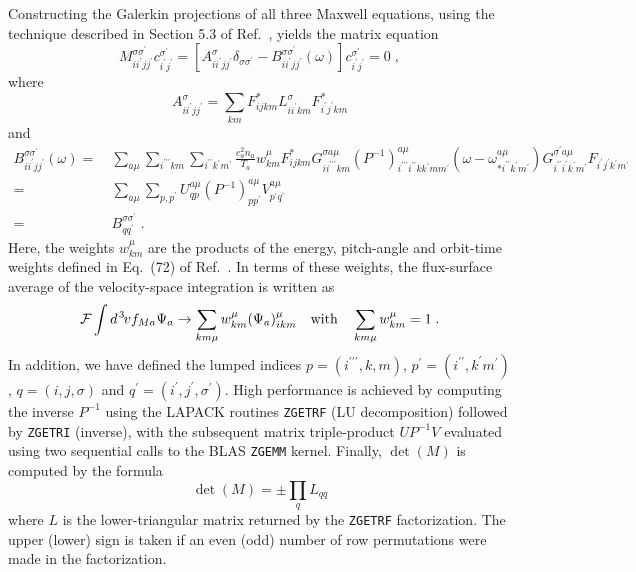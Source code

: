 %
Constructing the Galerkin projections of all three Maxwell 
equations, using the technique described in Section 5.3 
of Ref.~\cite{candy:2003}, yields the matrix equation
%
\begin{equation}
M_{ii^\prime jj^\prime} ^{\sigma\sigma^\prime} c_{i^\prime j^\prime}^{\sigma^\prime}  
= \left[ A_{ii^\prime jj^\prime}^\sigma \delta_{\sigma\sigma^\prime} -
B_{ii^\prime jj^\prime}^{\sigma\sigma^\prime}(\omega) \right] 
c_{i^\prime j^\prime}^{\sigma^\prime} = 0 \; ,
\end{equation}
%
where
%
\begin{equation}
 A_{ii^\prime jj^\prime}^\sigma = \sum_{km} 
 F_{ijkm}^* L^\sigma_{ii^\prime km} F_{i^\prime j^\prime km}^* 
\end{equation}
%
and
%
\begin{align}
B_{ii^\prime jj^\prime}^{\sigma\sigma^\prime}(\omega) =
&~\sum_{a\mu} \sum_{i^{\prime\prime\prime} k m} \sum_{i^{\prime\prime} k^\prime m^\prime}
\frac{e_a^2 n_a}{T_a} w_{km}^\mu F_{ijkm}^* G_{ii^{\prime\prime\prime} km}^{\sigma a\mu}
(P^{-1})_{i^{\prime\prime\prime} i^{\prime\prime} kk^\prime mm^\prime}^{a\mu}
(\omega-\omega_{*i^{\prime\prime} k^\prime m^\prime}^{a\mu})
G_{i^{\prime\prime} i^{\prime} k^\prime m^\prime}^{\sigma^\prime a\mu}
 F_{i^\prime j^\prime k^\prime m^\prime} \\
= &~\sum_{a\mu} \sum_{p,p^\prime} U_{q p}^{a\mu} (P^{-1})_{p p^\prime}^{a\mu} 
V_{p^\prime q^\prime}^{a\mu} \\
= &~B_{qq^\prime}^{\sigma \sigma^\prime} \; .
\end{align}
%
Here, the weights $w_{km}^\mu$ are the products of the energy, 
pitch-angle and orbit-time weights defined in Eq.~(72) of 
Ref.~\cite{candy:2003}.  In terms of these weights, the flux-surface 
average of the velocity-space integration is written as 
%
\begin{equation}
{\cal F} \int d^{\hskip 1pt 3} \hskip -1pt v f_{Ma} \Psi_a \rightarrow  
 \sum_{km\mu} w_{km}^\mu (\Psi_a)_{ikm}^\mu 
\quad\mbox{with}\quad
\sum_{km\mu} w_{km}^\mu = 1 \; .
\end{equation}
%
In addition, we have defined the lumped indices 
$p=(i^{\prime\prime\prime},k,m)$, $p^\prime = (i^{\prime\prime},k^\prime
m^\prime)$, $q=(i,j,\sigma)$ and $q^\prime=(i^\prime,j^\prime,\sigma^\prime)$.  
High performance is achieved by computing the inverse $P^{-1}$ using 
the LAPACK routines {\tt ZGETRF} (LU decomposition) followed by 
{\tt ZGETRI} (inverse), with the subsequent matrix triple-product 
$U P^{-1} V$ evaluated using two sequential calls to the 
BLAS {\tt ZGEMM} kernel.  Finally, $\det (M)$ is computed by 
the formula 
%
\begin{equation}
\det (M) = \pm \prod_q L_{qq}
\end{equation}
%
where $L$ is the lower-triangular matrix returned by 
the {\tt ZGETRF} factorization.  The upper (lower) sign 
is taken if an even (odd) number of row permutations 
were made in the factorization.


